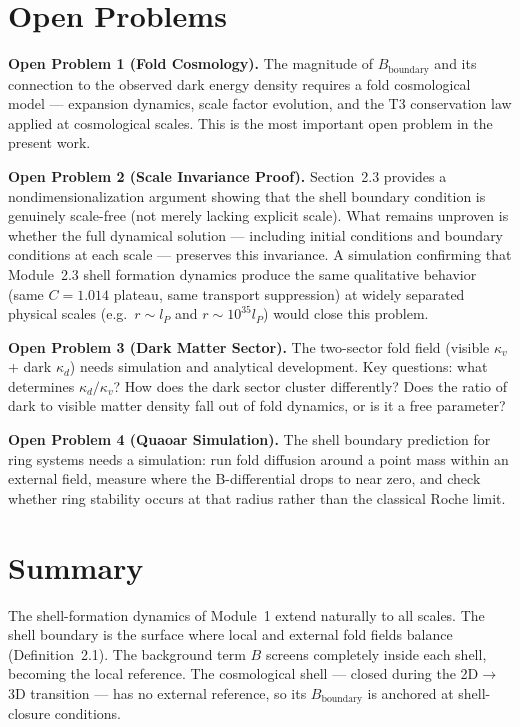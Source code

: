 \documentclass[12pt]{article}
\begin{document}
\section{Open Problems}

\textbf{Open Problem 1 (Fold Cosmology).}
The magnitude of $B_{\mathrm{boundary}}$ and its connection to the
observed dark energy density requires a fold cosmological model ---
expansion dynamics, scale factor evolution, and the T3 conservation
law applied at cosmological scales. This is the most important open
problem in the present work.

\textbf{Open Problem 2 (Scale Invariance Proof).}
Section~2.3 provides a nondimensionalization argument showing that
the shell boundary condition is genuinely scale-free (not merely
lacking explicit scale).
What remains unproven is whether the full dynamical solution ---
including initial conditions and boundary conditions at each scale ---
preserves this invariance.
A simulation confirming that Module~2.3 shell formation dynamics
produce the same qualitative behavior (same $C = 1.014$ plateau,
same transport suppression) at widely separated physical scales
(e.g.\ $r \sim l_P$ and $r \sim 10^{35} l_P$) would close this problem.

\textbf{Open Problem 3 (Dark Matter Sector).}
The two-sector fold field (visible $\kappa_v$ + dark $\kappa_d$) needs
simulation and analytical development. Key questions: what determines
$\kappa_d/\kappa_v$? How does the dark sector cluster differently?
Does the ratio of dark to visible matter density fall out of fold
dynamics, or is it a free parameter?

\textbf{Open Problem 4 (Quaoar Simulation).}
The shell boundary prediction for ring systems needs a simulation:
run fold diffusion around a point mass within an external field,
measure where the B-differential drops to near zero, and check
whether ring stability occurs at that radius rather than the
classical Roche limit.

\section{Summary}

The shell-formation dynamics of Module~1 extend naturally to all scales.
The shell boundary is the surface where local and external fold fields
balance (Definition~2.1). The background term $B$ screens completely
inside each shell, becoming the local reference. The cosmological shell
--- closed during the 2D$\to$3D transition --- has no external reference,
so its $B_{\mathrm{boundary}}$ is anchored at shell-closure conditions.
\end{document}
